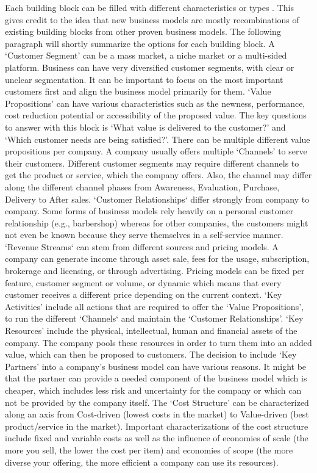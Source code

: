 		Each building block can be filled with different characteristics or types \cite{osterwalder}. This gives credit to the idea that new business models are mostly recombinations of existing building blocks from other proven business models. The following paragraph will shortly summarize the options for each building block. A `Customer Segment' can be a mass market, a niche market or a multi-sided platform. Business can have very diversified customer segments, with clear or unclear segmentation. It can be important to focus on the most important customers first and align the business model primarily for them. `Value Propositions' can have various characteristics such as the newness, performance, cost reduction potential or accessibility of the proposed value. The key questions to answer with this block is `What value is delivered to the customer?' and `Which customer needs are being satisfied?'. There can be multiple different value propositions per company. A company usually offers multiple `Channels' to serve their customers. Different customer segments may require different channels to get the product or service, which the company offers. Also, the channel may differ along the different channel phases from Awareness, Evaluation, Purchase, Delivery to After sales. `Customer Relationships` differ strongly from company to company. Some forms of business models rely heavily on a personal customer relationship (e.g., barbershop) whereas for other companies, the customers might not even be known because they serve themselves in a self-service manner. `Revenue Streams` can stem from different sources and pricing models. A company can generate income through asset sale, fees for the usage, subscription, brokerage and licensing, or through advertising. Pricing models can be fixed per feature, customer segment or volume, or dynamic which means that every customer receives a different price depending on the current context. `Key Activities' include all actions that are required to offer the `Value Propositions', to run the different `Channels` and maintain the `Customer Relationships'. `Key Resources' include the physical, intellectual, human and financial assets of the company. The company pools these resources in order to turn them into an added value, which can then be proposed to customers. The decision to include `Key Partners' into a company's business model can have various reasons. It might be that the partner can provide a needed component of the business model which is cheaper, which includes less risk and uncertainty for the company or which can not be provided by the company itself. The `Cost Structure' can be characterized along an axis from Cost-driven (lowest costs in the market) to Value-driven (best product/service in the market). Important characterizations of the cost structure include fixed and variable costs as well as the influence of economies of scale (the more you sell, the lower the cost per item) and economies of scope (the more diverse your offering, the more efficient a company can use its resources).
\vspace{-1em}
